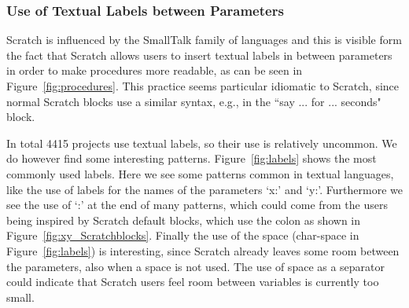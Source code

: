 \documentclass[conference]{IEEEtran}
\begin{document}
\subsubsection{Use of Textual Labels between Parameters}
Scratch is influenced by the SmallTalk family of languages and this is visible form the fact that Scratch allows users to insert textual labels in between parameters in order to make procedures more readable, as can be seen in Figure~\ref{fig:procedures}.
This practice seems particular idiomatic to Scratch, since normal Scratch blocks use a similar syntax, e.g., in the ``say ... for ... seconds" block. 

In total 4415 projects use textual labels, so their use is relatively uncommon. We do however find some interesting patterns. 
Figure~\ref{fig:labels} shows the most commonly used labels. Here we see some patterns common in textual languages, like the use of labels for the names of the parameters `x:' and `y:'. 
Furthermore we see the use of `:' at the end of many patterns, which could come from the users being inspired by Scratch default blocks, which use the colon as shown in Figure~\ref{fig:xy_Scratchblocks}. 
Finally the use of the space (char-space in Figure~\ref{fig:labels}) is interesting, since Scratch already leaves some room between the parameters, also when a space is not used. 
The use of space as a separator could indicate that Scratch users feel room between variables is currently too small.
\end{document}
